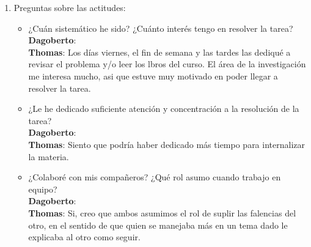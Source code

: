 \documentclass{udparticle}
\begin{document}
\begin{enumerate}
\begin{itemize}
                {\bf Thomas}: Identificar el problema, buscar una estructura óptima para la resolución de este y finalmente implementarla.
            \item ¿Qué pasos requirieron más tiempo? ¿Cuánto comprendí las instrucciones?\\
                {\bf Dagoberto}:\\ 
                {\bf Thomas}: Lo que más tiempo me tomó fue el leer libros para comprender el objetivo de la programación dinámica y su implementación.
        \end{itemize}
    \item Preguntas sobre las actitudes:\\
        \begin{itemize}
            \item ¿Cuán sistemático he sido? ¿Cuánto interés tengo en resolver la tarea?\\
                {\bf Dagoberto}: \\
                {\bf Thomas}: Los días viernes, el fin de semana y las tardes las dediqué a revisar el problema y/o leer los lbros del curso. El área de la investigación me interesa mucho, asi que estuve muy motivado en poder llegar a resolver la tarea.
            \item ¿Le he dedicado suficiente atención y concentración a la resolución de la tarea? \\
                {\bf Dagoberto}:\\
                {\bf Thomas}: Siento que podría haber dedicado más tiempo para internalizar la materia.
            \item ¿Colaboré con mis compañeros? ¿Qué rol asumo cuando trabajo en equipo?\\
                {\bf Dagoberto}: \\
                {\bf Thomas}: Si, creo que ambos asumimos el rol de suplir las falencias del otro, en el sentido de que quien se manejaba más en un tema dado le explicaba al otro como seguir.
        \end{itemize}
\end{enumerate}
\end{document}
